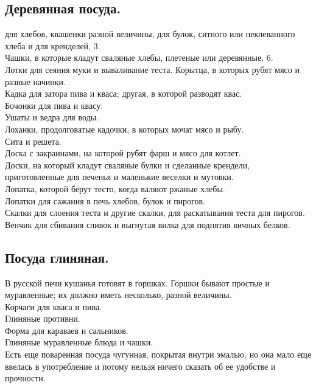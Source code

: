 \subsection{Деревянная посуда.}
 для хлебов, квашенки разной величины, для булок, ситного или пеклеванного хлеба и для кренделей, 3.\\
Чашки, в которые кладут сваляные хлебы, плетеные или деревянные, 6.\\
Лотки для сеяния муки и вываливание теста.
Корытца, в которых рубят мясо и разные начинки.\\
Кадка для затора пива и кваса; другая, в которой разводят квас.\\
Бочонки для пива и квасу.\\
Ушаты и ведра для воды.\\
Лоханки, продолговатые кадочки, в которых мочат мясо и рыбу.\\
Сита и решета.\\
Доска с закраинами, на которой рубят фарш и мясо для котлет.\\
Доски, на который кладут сваляные булки и сделанные крендели, приготовленные для печенья и маленькие веселки и мутовки.\\
Лопатка, которой берут тесто, когда валяют ржаные хлебы.\\
Лопатки для сажания в печь хлебов, булок и пирогов.\\
Скалки для слоения теста и другие скалки, для раскатывания теста для пирогов.\\
Венчик для сбивания сливок и выгнутая вилка для поднятия яичных белков.

\subsection{Посуда глиняная.}
В русской печи кушанья готовят в горшках. Горшки бывают простые и муравленные; их должно иметь несколько, разной величины.\\
Корчаги для кваса и пива.\\
Глиняные противни.\\
Форма для караваев и сальников.\\
Глиняные муравленные блюда и чашки.\\
Есть еще поваренная посуда чугунная, покрытая внутри эмалью, но она мало еще ввелась в употребление и потому нельзя ничего сказать об ее удобстве и прочности.

